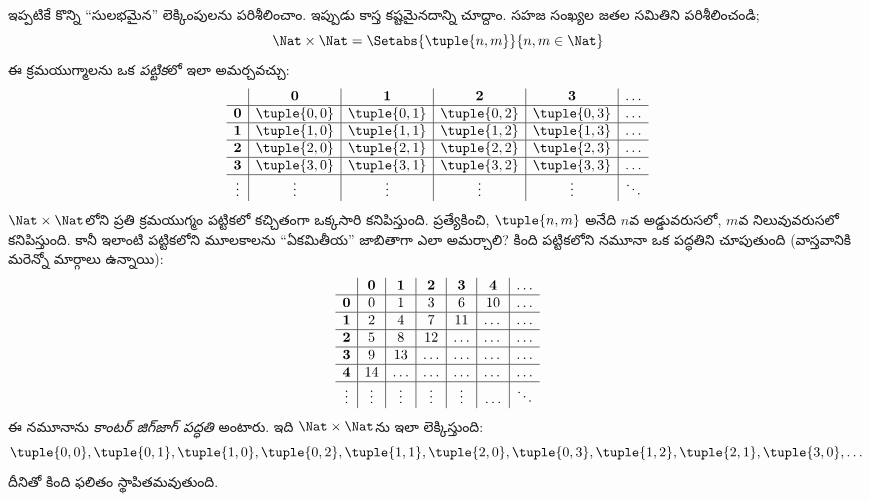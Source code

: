 \documentclass[../../../include/open-logic-section]{subfiles}
\begin{document}


\begin{explain}
ఇప్పటికే కొన్ని ``సులభమైన'' లెక్కింపులను పరిశీలించాం. ఇప్పుడు కాస్త
కష్టమైనదాన్ని చూద్దాం. సహజ సంఖ్యల జతల సమితిని పరిశీలించండి;
\[
\Nat \times \Nat = \Setabs{\tuple{n,m}}{n,m \in \Nat}
\]
ఈ క్రమయుగ్మాలను ఒక \emph{పట్టిక}లో ఇలా అమర్చవచ్చు:
\[
\begin{array}{ c | c | c | c | c | c}
& \mathbf 0 & \mathbf 1 & \mathbf 2 & \mathbf 3 & \dots \\
\hline
\mathbf 0 & \tuple{0,0} & \tuple{0,1} & \tuple{0,2} & \tuple{0,3} & \dots \\
\hline
\mathbf 1 & \tuple{1,0} & \tuple{1,1} & \tuple{1,2} & \tuple{1,3} & \dots \\
\hline
\mathbf 2 & \tuple{2,0} & \tuple{2,1} & \tuple{2,2} & \tuple{2,3} & \dots \\
\hline
\mathbf 3 & \tuple{3,0} & \tuple{3,1} & \tuple{3,2} & \tuple{3,3} & \dots \\
\hline
\vdots & \vdots & \vdots & \vdots & \vdots & \ddots\\
\end{array}
\]
$\Nat \times \Nat$లోని ప్రతి క్రమయుగ్మం పట్టికలో కచ్చితంగా ఒక్కసారి
కనిపిస్తుంది. ప్రత్యేకించి, $\tuple{n,m}$ అనేది $n$వ అడ్డువరుసలో,
$m$వ నిలువువరుసలో కనిపిస్తుంది. కానీ ఇలాంటి పట్టికలోని మూలకాలను
``ఏకమితీయ'' జాబితాగా ఎలా అమర్చాలి? కింది పట్టికలోని నమూనా ఒక పద్ధతిని
చూపుతుంది (వాస్తవానికి మరెన్నో మార్గాలు ఉన్నాయి):
\[
\begin{array}{ c | c | c | c | c | c | c}
& \mathbf 0 & \mathbf 1 & \mathbf 2 & \mathbf 3 & \mathbf 4 &\dots \\
\hline
\mathbf 0 & 0  & 1& 3 & 6& 10 &\ldots \\
\hline
\mathbf 1 &2 & 4& 7 & 11 & \dots &\ldots \\
\hline
\mathbf 2 & 5 & 8 & 12 & \ldots & \dots&\ldots \\
\hline
\mathbf 3 & 9 & 13 & \ldots & \ldots & \dots & \ldots \\
\hline
\mathbf 4 & 14 & \ldots & \ldots & \ldots & \dots & \ldots \\
\hline
\vdots & \vdots & \vdots & \vdots & \vdots&\ldots & \ddots\\
\end{array}
\]\noindent
ఈ నమూనాను \emph{కాంటర్ జిగ్‌జాగ్ పద్ధతి} అంటారు. ఇది
$\Nat \times \Nat$ను ఇలా లెక్కిస్తుంది:
\[
\tuple{0,0}, \tuple{0,1}, \tuple{1,0}, \tuple{0,2}, \tuple{1,1},
\tuple{2,0}, \tuple{0,3}, \tuple{1,2}, \tuple{2,1}, \tuple{3,0}, \dots
\]
దీనితో కింది ఫలితం స్థాపితమవుతుంది.
\end{explain}
\end{document}
